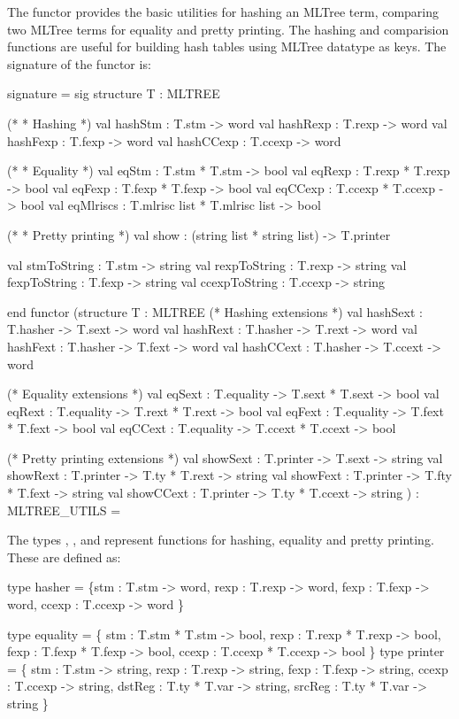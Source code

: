 The functor  provides
the basic utilities for hashing an MLTree term, comparing two
MLTree terms for equality and pretty printing.  The hashing and comparision
functions are useful for building hash tables using MLTree datatype as keys.
The signature of the functor is:
\begin{SML}
signature  =
sig
   structure T : MLTREE 

   (*
    * Hashing
    *)
   val hashStm   : T.stm -> word
   val hashRexp  : T.rexp -> word
   val hashFexp  : T.fexp -> word
   val hashCCexp : T.ccexp -> word

   (*
    * Equality
    *)
   val eqStm     : T.stm * T.stm -> bool
   val eqRexp    : T.rexp * T.rexp -> bool
   val eqFexp    : T.fexp * T.fexp -> bool
   val eqCCexp   : T.ccexp * T.ccexp -> bool
   val eqMlriscs : T.mlrisc list * T.mlrisc list -> bool

   (*
    * Pretty printing 
    *)
   val show : (string list * string list) -> T.printer

   val stmToString   : T.stm -> string
   val rexpToString  : T.rexp -> string
   val fexpToString  : T.fexp -> string
   val ccexpToString : T.ccexp -> string

end
functor  
  (structure T : MLTREE
   (* Hashing extensions *)
   val hashSext  : T.hasher -> T.sext -> word
   val hashRext  : T.hasher -> T.rext -> word
   val hashFext  : T.hasher -> T.fext -> word
   val hashCCext : T.hasher -> T.ccext -> word

   (* Equality extensions *)
   val eqSext  : T.equality -> T.sext * T.sext -> bool
   val eqRext  : T.equality -> T.rext * T.rext -> bool
   val eqFext  : T.equality -> T.fext * T.fext -> bool
   val eqCCext : T.equality -> T.ccext * T.ccext -> bool

   (* Pretty printing extensions *)
   val showSext  : T.printer -> T.sext -> string
   val showRext  : T.printer -> T.ty * T.rext -> string
   val showFext  : T.printer -> T.fty * T.fext -> string
   val showCCext : T.printer -> T.ty * T.ccext -> string
  ) : MLTREE_UTILS =
\end{SML} 

The types , ,
and  represent functions for hashing,
equality and pretty printing.   These are defined as:
\begin{SML} 
   type hasher =
      \{stm    : T.stm -> word,
       rexp   : T.rexp -> word,
       fexp   : T.fexp -> word,
       ccexp  : T.ccexp -> word
      \}    

   type equality =
      \{ stm    : T.stm * T.stm -> bool,
        rexp   : T.rexp * T.rexp -> bool,
        fexp   : T.fexp * T.fexp -> bool,
        ccexp  : T.ccexp * T.ccexp -> bool
      \} 
   type printer =
      \{ stm    : T.stm -> string,
        rexp   : T.rexp -> string,
        fexp   : T.fexp -> string,
        ccexp  : T.ccexp -> string,
        dstReg : T.ty * T.var -> string,
        srcReg : T.ty * T.var -> string
      \}
\end{SML}

